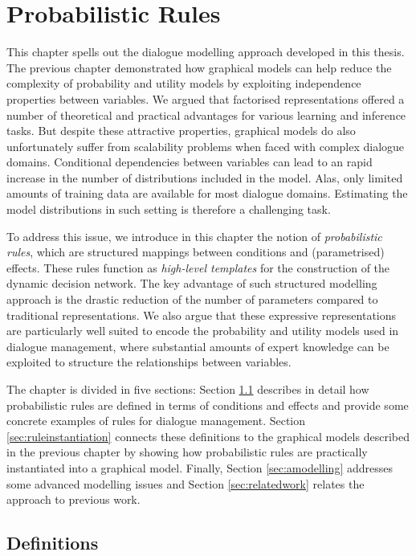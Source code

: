 \chapter{Probabilistic Rules}
\label{chap:rules}

This chapter spells out the dialogue modelling approach developed in this thesis.  The previous chapter demonstrated how graphical models can help reduce the complexity of probability and utility models by exploiting independence properties between variables. We argued that factorised representations offered a number of theoretical and practical advantages for various learning and inference tasks. But despite these attractive properties, graphical models do also unfortunately suffer from scalability problems when faced with complex dialogue domains.  Conditional dependencies between variables can lead to an rapid increase in the number of distributions included in the model. Alas, only limited amounts of training data are available for most dialogue domains.  Estimating the model distributions in such setting is therefore a challenging task. 

To address this issue, we introduce in this chapter the notion of \textit{probabilistic rules}, which are structured mappings between conditions and  (parametrised) effects.  These rules function as \textit{high-level templates} for the construction of the dynamic decision network.  The key advantage of such structured modelling approach is the drastic reduction of the number of parameters compared to traditional representations.  We also argue that these expressive representations are particularly well suited to encode the probability and utility models used in dialogue management, where substantial amounts of expert knowledge can be exploited to structure the relationships between variables. 

The chapter is divided in five sections: Section \ref{sec:prules} describes in detail how probabilistic rules are defined in terms of conditions and effects and provide some concrete examples of rules for dialogue management.  Section \ref{sec:ruleinstantiation} connects these definitions to the graphical models described in the previous chapter by showing how probabilistic rules are practically instantiated into a graphical model.  Finally, Section \ref{sec:amodelling} addresses some advanced modelling issues and Section \ref{sec:relatedwork} relates the approach to previous work.

\section{Definitions}
\label{sec:prules}

